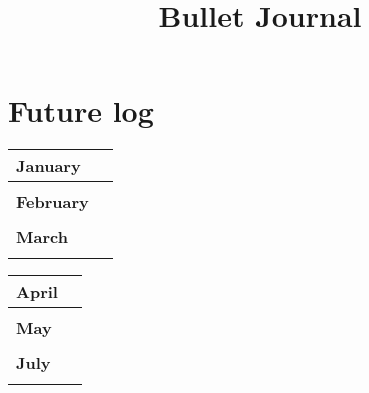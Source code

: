 \documentclass[a5paper,11pt]{article}
\title{Bullet Journal}
\begin{document}
\maketitle
\tableofcontents
\newpage
\section*{Future log}

\begin{tabularx}{\textwidth}{X|l}
	\hline
	\textbf{January} \\
	\hline
	\blindtext \\
	\hline
	\textbf{February} \\
	\hline
	\blindtext \\
	\hline
	\textbf{March} \\
	\hline
	\blindtext \\
\end{tabularx}
\newpage
\begin{tabularx}{\textwidth}{X|l}
	\hline
	\textbf{April} \\
	\hline
	\blindtext \\
	\hline
	\textbf{May} \\
	\hline
	\blindtext \\
	\hline
	\textbf{July} \\
	\hline
	\blindtext \\
\end{tabularx}
\end{document}
